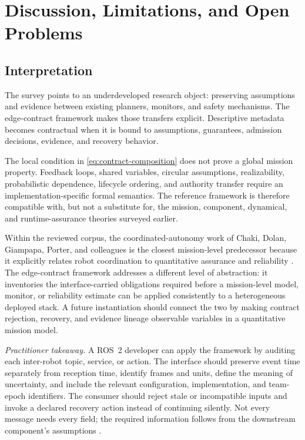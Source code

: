\section{Discussion, Limitations, and Open Problems}
\label{sec:discussion}

\subsection{Interpretation}

The survey points to an underdeveloped research object: preserving assumptions
and evidence between existing planners, monitors, and safety mechanisms.  The
edge-contract framework makes those transfers explicit.  Descriptive metadata
becomes contractual when it is bound to assumptions, guarantees, admission
decisions, evidence, and recovery behavior.

The local condition in \cref{eq:contract-composition} does not prove a global
mission property.  Feedback loops, shared variables, circular assumptions,
realizability, probabilistic dependence, lifecycle ordering, and authority
transfer require an implementation-specific formal semantics.  The reference
framework is therefore compatible with, but not a substitute for, the mission,
component, dynamical, and runtime-assurance theories surveyed earlier.

Within the reviewed corpus, the coordinated-autonomy work of Chaki, Dolan,
Giampapa, Porter, and colleagues is the closest mission-level predecessor
because it explicitly relates robot coordination to quantitative assurance and
reliability
\cite{chaki2013assurance,chaki2013probabilistic,porter2013reliability,
stancliff2006missionreliability}.  The edge-contract framework addresses a
different level of abstraction: it inventories the interface-carried
obligations required before a mission-level model, monitor, or reliability
estimate can be applied consistently to a heterogeneous deployed stack.  A
future instantiation should connect the two by making contract rejection,
recovery, and evidence lineage observable variables in a quantitative mission
model.

\emph{Practitioner takeaway.}  A ROS~2 developer can apply the framework by
auditing each inter-robot topic, service, or action.  The interface should
preserve event time separately from reception time, identify frames and units,
define the meaning of uncertainty, and include the relevant configuration,
implementation, and team-epoch identifiers.  The consumer should reject stale
or incompatible inputs and invoke a declared recovery action instead of
continuing silently.  Not every message needs every field; the required
information follows from the downstream component's assumptions
\cite{macenski2022ros2,omg2015dds,kronauer2021latency}.

